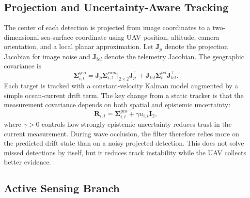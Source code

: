 \documentclass[runningheads]{llncs}
\begin{document}
\subsection{Projection and Uncertainty-Aware Tracking}

The center of each detection is projected from image coordinates to a two-dimensional sea-surface coordinate using UAV position, altitude, camera orientation, and a local planar approximation. Let $\mathbf{J}_p$ denote the projection Jacobian for image noise and $\mathbf{J}_{tel}$ denote the telemetry Jacobian. The geographic covariance is
\begin{equation}
  \boldsymbol{\Sigma}^{geo}_{i,t}
  =\mathbf{J}_p\boldsymbol{\Sigma}^{cam}_{i,t}\big|_{2\times2}\mathbf{J}_p^{\top}
  +\mathbf{J}_{tel}\boldsymbol{\Sigma}^{tel}_{t}\mathbf{J}_{tel}^{\top}.
  \label{eq:geo_cov}
\end{equation}
Each target is tracked with a constant-velocity Kalman model augmented by a simple ocean-current drift term. The key change from a static tracker is that the measurement covariance depends on both spatial and epistemic uncertainty:
\begin{equation}
  \mathbf{R}_{i,t}=\boldsymbol{\Sigma}^{geo}_{i,t}+\gamma u_{i,t}\mathbf{I}_2,
  \label{eq:measurement_cov}
\end{equation}
where $\gamma>0$ controls how strongly epistemic uncertainty reduces trust in the current measurement. During wave occlusion, the filter therefore relies more on the predicted drift state than on a noisy projected detection. This does not solve missed detections by itself, but it reduces track instability while the UAV collects better evidence.

\subsection{Active Sensing Branch}
\end{document}
